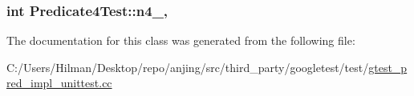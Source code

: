 \subsubsection[{n4\+\_\+}]{\setlength{\rightskip}{0pt plus 5cm}int Predicate4\+Test\+::n4\+\_\+\hspace{0.3cm}{\ttfamily [static]}, {\ttfamily [protected]}}\label{class_predicate4_test_ae42e23ce11e3f1c6b813496d6180cc67}


The documentation for this class was generated from the following file\+:\begin{DoxyCompactItemize}
\item 
C\+:/\+Users/\+Hilman/\+Desktop/repo/anjing/src/third\+\_\+party/googletest/test/\hyperlink{gtest__pred__impl__unittest_8cc}{gtest\+\_\+pred\+\_\+impl\+\_\+unittest.\+cc}\end{DoxyCompactItemize}
